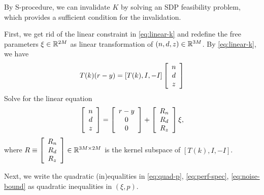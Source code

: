 \documentclass[11pt, onecolumn]{article}
\begin{document}
By S-procedure, we can invalidate $K$ by solving an SDP feasibility problem, which provides
a sufficient condition for the invalidation.

First, we get rid of the linear constraint in \eqref{eq:linear-k} and redefine the free parameters
$\xi \in\mathbb R^{2M}$ as linear transformation of $(n,d,z) \in\mathbb R^{3M}$.  By \eqref{eq:linear-k}, we have
\begin{align*}
  T(k) (r-y) = [T(k), I, - I]   \left[ \begin{array}[c]{c} n\\d\\z \end{array} \right]
\end{align*}
Solve for the linear equation
\begin{align}
  \label{eq:ndz-xi}
  \left[ \begin{array}[c]{c} n\\d\\z \end{array} \right]
  = \left[ \begin{array}[c]{c} r-y\\0\\0 \end{array} \right]
  +  \left[ \begin{array}[c]{c} R_n\\R_d\\R_z \end{array} \right] \xi,
\end{align}
where $R\equiv \left[ \begin{array}[c]{c} R_n\\R_d\\R_z \end{array} \right] \in\mathbb R^{3M\times 2M}$ is the
kernel subspace of $ [T(k), I, - I] $.

Next, we write the quadratic (in)equalities in \eqref{eq:quad-p}, \eqref{eq:perf-spec},
\eqref{eq:noise-bound} as quadratic inequalities in $(\xi, p)$.
\end{document}
